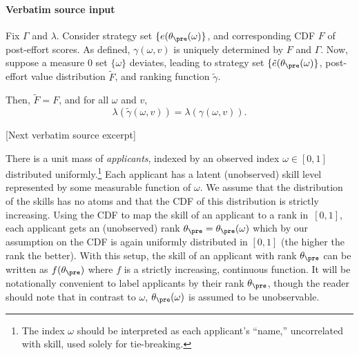 \documentclass[10pt]{article}
\begin{document}
\paragraph{Verbatim source input}
\begin{ReviewVerbatim}
\begin{lemma}
\label{lem:deviationsmeasure0}
Fix $\Gamma$ and $\lambda$. Consider strategy set $\{e(\theta_\pre(\omega)\}$, and corresponding CDF $F$ of post-effort scores. As defined, $\gamma(\omega, v)$ is uniquely determined by $F$ and $\Gamma$.
Now, suppose a measure $0$ set $\{\omega\}$ deviates, leading to strategy set $\{\tilde e(\theta_\pre(\omega)\}$, post-effort value distribution $\tilde F$, and ranking function $\tilde\gamma$.

Then, $\tilde F=F$, and for all $\omega$ and $v$,
$$\lambda(\tilde\gamma(\omega, v)) =  \lambda(\gamma(\omega, v)).$$



\end{lemma}

[Next verbatim source excerpt]

There is a unit mass of \textit{applicants}, indexed by an observed index $\omega \in [0,1]$ distributed uniformly.\footnote{The index $\omega$ should be interpreted as each applicant's ``name,'' uncorrelated with skill, used solely for tie-breaking.}  Each applicant has a latent (unobserved) skill level represented by some measurable function of $\omega$.
We assume that {the distribution of the skills} has no atoms and that the CDF of this distribution is strictly increasing.
Using the CDF to map the skill of an applicant to a rank in~$[0,1]$, each applicant gets an (unobserved) rank $\theta_\pre =\theta_\pre(\omega)$ which by our assumption on the CDF is again uniformly distributed in $[0, 1]$ (the higher the rank the better).  With this setup, the skill of an applicant with rank $\theta_\pre$ can be written as $f(\theta_\pre)$ where $f$ is a strictly increasing, continuous function.  {It will be notationally convenient to label applicants by their rank $\theta_\pre$, though the reader should note that in contrast to $\omega$, $\theta_\pre(\omega)$ is assumed to be unobservable.}


\end{ReviewVerbatim}
\end{document}
